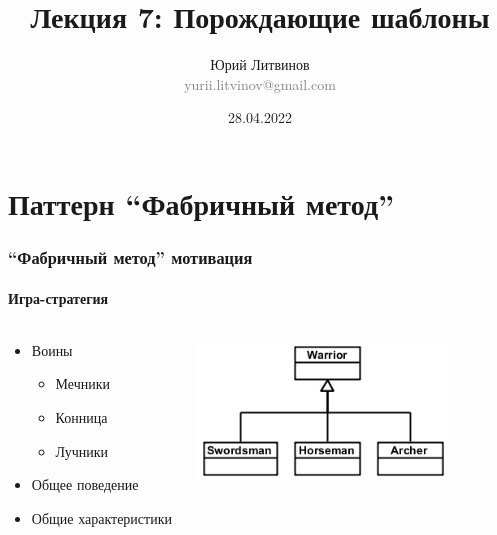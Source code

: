 \documentclass[xetex,mathserif,serif]{beamer}
\title[Шаблоны]{Лекция 7: Порождающие шаблоны}
\author[Юрий Литвинов]{Юрий Литвинов\\\small{\textcolor{gray}{yurii.litvinov@gmail.com}}}
\date{28.04.2022}
\begin{document}
    \frame{\titlepage}

    \section{Паттерн ``Фабричный метод''}

    \begin{frame}
        \frametitle{``Фабричный метод'' мотивация}
        \framesubtitle{Игра-стратегия}
        \begin{columns}
            \begin{column}{0.5\textwidth}
                \begin{itemize}
                    \item Воины
                    \begin{itemize}
                        \item Мечники
                        \item Конница
                        \item Лучники
                    \end{itemize}
                    \item Общее поведение
                    \item Общие характеристики
                \end{itemize}
            \end{column}
            \begin{column}{0.5\textwidth}
                \begin{center}
                    \includegraphics[width=0.8\textwidth]{warriors.png}
                \end{center}
            \end{column}
        \end{columns}
    \end{frame}
\end{document}
